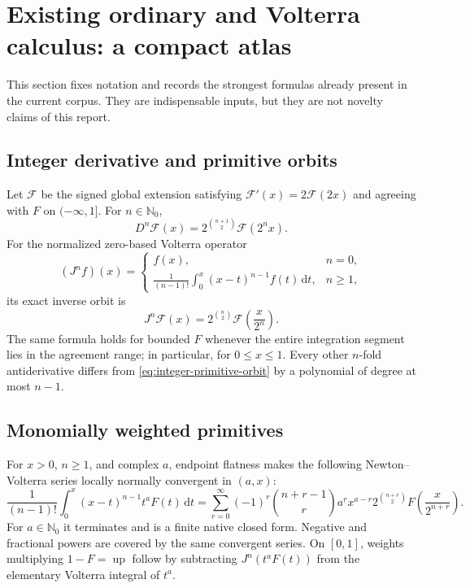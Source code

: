 \documentclass[11pt,oneside]{article}
\numberwithin{equation}{section}
\theoremstyle{plain}
\theoremstyle{definition}
\theoremstyle{remark}
\newcommand{\N}{\mathbb N}
\newcommand{\Up}{\operatorname{up}}
\newcommand{\dd}{\,\mathrm d}
\newcommand{\fall}[2]{#1^{\underline{#2}}}
\newcommand{\Fext}{\mathscr F}
\begin{document}
\section{Existing ordinary and Volterra calculus: a compact atlas}
\label{sec:baseline-atlas}

This section fixes notation and records the strongest formulas already present
in the current corpus.  They are indispensable inputs, but they are not
novelty claims of this report.

\subsection{Integer derivative and primitive orbits}

Let $\Fext$ be the signed global extension satisfying
$\Fext'(x)=2\Fext(2x)$ and agreeing with $F$ on $(-\infty,1]$.  For
$n\in\N_0$,
\begin{equation}
 D^n\Fext(x)=2^{\binom{n+1}{2}}\Fext(2^nx).
 \label{eq:integer-derivative-orbit}
\end{equation}
For the normalized zero-based Volterra operator
\begin{equation}
 (J^nf)(x)=
 \begin{cases}
 f(x),&n=0,\\[1mm]
 \displaystyle\frac1{(n-1)!}\int_0^x(x-t)^{n-1}f(t)\dd t,&n\ge1,
 \end{cases}
 \label{eq:J-def}
\end{equation}
its exact inverse orbit is
\begin{equation}
 J^n\Fext(x)=2^{\binom n2}\Fext\!\left(\frac{x}{2^n}\right).
 \label{eq:integer-primitive-orbit}
\end{equation}
The same formula holds for bounded $F$ whenever the entire integration segment
lies in the agreement range; in particular, for $0\le x\le1$.
Every other $n$-fold antiderivative differs from \cref{eq:integer-primitive-orbit}
by a polynomial of degree at most $n-1$.

\subsection{Monomially weighted primitives}

For $x>0$, $n\ge1$, and complex $a$, endpoint flatness makes the following
Newton--Volterra series locally normally convergent in $(a,x)$:
\begin{equation}
 \frac1{(n-1)!}\int_0^x(x-t)^{n-1}t^aF(t)\dd t
 =\sum_{r=0}^{\infty}(-1)^r
 \binom{n+r-1}{r}\fall{a}{r}
 x^{a-r}2^{\binom{n+r}{2}}
 F\!\left(\frac{x}{2^{n+r}}\right).
 \label{eq:weighted-newton-volterra}
\end{equation}
For $a\in\N_0$ it terminates and is a finite native closed form.  Negative and
fractional powers are covered by the same convergent series.  On $[0,1]$,
weights multiplying $1-F=\Up$ follow by subtracting
$J^n(t^aF(t))$ from the elementary Volterra integral of $t^a$.
\end{document}
